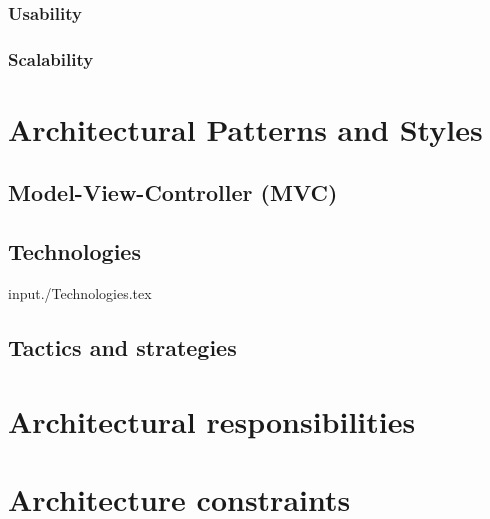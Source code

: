 \documentclass[a4paper,12pt,titlepage]{article}
\begin{document}
			\subsubsection{Usability}
			
			
			\subsubsection{Scalability}
			



\section{Architectural Patterns and Styles}
	\subsection{Model-View-Controller (MVC)}
	
	
	\subsection{Technologies}
	input{./Technologies.tex}
	
	\subsection{Tactics and strategies}
	
\section{Architectural responsibilities}
\section{Architecture constraints}

%
\end{document}
